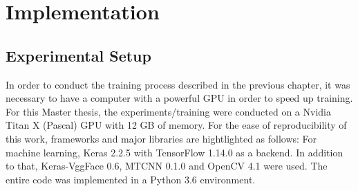 \chapter{Implementation}
\section{Experimental Setup}
In order to conduct the training process described in the previous chapter, it was necessary to have a computer with a powerful GPU in order to speed up training. For this Master thesis, the experiments/training were conducted on a Nvidia Titan X (Pascal) GPU with 12 GB of memory. 
\newline\newline
For the ease of reproducibility of this work, frameworks and major libraries are hightlighted as follows: For machine learning, Keras 2.2.5 with TensorFlow 1.14.0 as a backend. In addition to that, Keras-VggFace 0.6, MTCNN 0.1.0 and OpenCV 4.1 were used. The entire code was implemented in a Python 3.6 environment.


